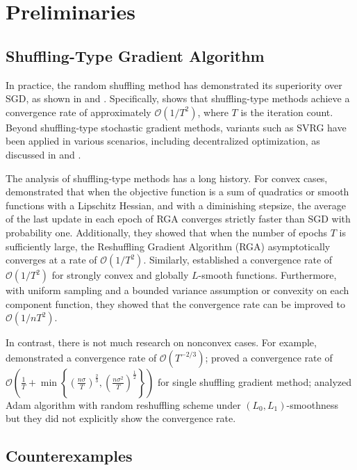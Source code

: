 \documentclass{article} %
\theoremstyle{plain}
\theoremstyle{definition}
\theoremstyle{remark}
\begin{document}
\section{Preliminaries}
\label{prelim}

\subsection{Shuffling-Type Gradient Algorithm}

In practice, the random shuffling method has demonstrated its superiority over SGD, as shown in \citet{Bo09} and \citet{Bo12}. Specifically, \citet{Bo09} shows that shuffling-type methods achieve a convergence rate of approximately $\mathcal{O}(1/T^2)$, where $T$ is the iteration count. Beyond shuffling-type stochastic gradient methods, variants such as SVRG have been applied in various scenarios, including decentralized optimization, as discussed in \citet{Sh16} and \citet{DeGo16}.

The analysis of shuffling-type methods has a long history. For convex cases, \citet{GuOzPa21} demonstrated that when the objective function is a sum of quadratics or smooth functions with a Lipschitz Hessian, and with a diminishing stepsize, the average of the last update in each epoch of RGA converges strictly faster than SGD with probability one. Additionally, they showed that when the number of epochs $T$ is sufficiently large, the Reshuffling Gradient Algorithm (RGA) asymptotically converges at a rate of $\mathcal{O}(1/T^2)$. Similarly, \citet{nguyen2021unified} established a convergence rate of $\mathcal{O}(1/T^2)$ for strongly convex and globally $L$-smooth functions. Furthermore, with uniform sampling and a bounded variance assumption or convexity on each component function, they showed that the convergence rate can be improved to $\mathcal{O}(1/nT^2)$.

In contrast, there is not much research on nonconvex cases. For example, \citet{nguyen2021unified} demonstrated a convergence rate of $\mathcal{O}(T^{-2/3})$; \citet{koloskova2023shuffle} proved a convergence rate of $\mathcal{O}\left(\frac{1}{T}+\min\left\{\left(\frac{n\sigma}{T}\right)^{\frac23},\left(\frac{n\sigma^2}{T}\right)^{\frac12}\right\}\right)$ for single shuffling gradient method; \citet{wang2024provable} analyzed Adam algorithm with random reshuffling scheme under $(L_0,L_1)$-smoothness but they did not explicitly show the convergence rate.

\subsection{Counterexamples}
\end{document}
